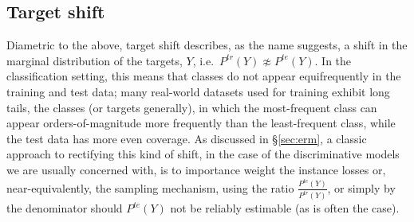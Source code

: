 \subsection{Target shift}\label{ssec:label-shift}
Diametric to the above, target shift describes, as the name suggests, a shift in the marginal
distribution of the targets, \(Y\), i.e.\ \( P^{tr}(Y) \not\approx P^{te}(Y) \).
%
In the classification setting, this means that classes do not appear equifrequently in the training
and test data; many real-world datasets used for training exhibit long tails, \wrt{} the classes
(or targets generally), in which the most-frequent class can appear orders-of-magnitude more
frequently than the least-frequent class, while the test data has more even coverage.
%
As discussed in \S\ref{sec:erm}, a classic approach to rectifying this kind of shift, in the case
of the discriminative models we are usually concerned with, is to importance weight the instance
losses or, near-equivalently, the sampling mechanism, using the ratio \(\frac{P^{te}(Y)}{P^{tr}(Y)}
\), or simply by the denominator should \( P^{te}(Y)\) not be reliably estimable (as is often the
case).
%
%
